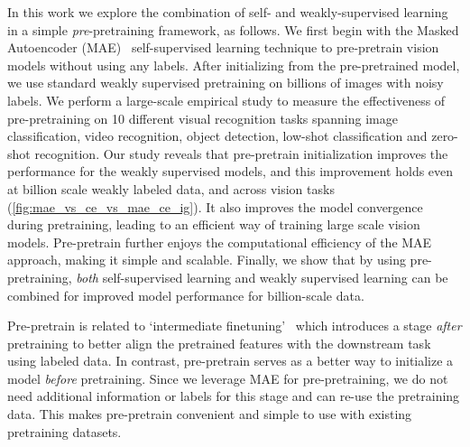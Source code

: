 \documentclass[10pt,twocolumn,letterpaper]{article}
\newcommand{\mae}{MAE\xspace}
\newcommand{\pptrain}{pre-pretrain\xspace}
\newcommand{\Pptrain}{Pre-pretrain\xspace}
\newcommand{\pptraining}{pre-pretraining\xspace}
\begin{document}
In this work we explore the combination of self- and weakly-supervised learning in a simple \textit{pre}-pretraining framework, as follows. 
We first begin with the Masked Autoencoder (\mae)~\cite{he2021masked} self-supervised learning technique to \pptrain vision models without using any labels.
After initializing from the pre-pretrained model, we use standard weakly supervised pretraining on billions of images with noisy labels.
We perform a large-scale empirical study to measure the effectiveness of pre-pretraining on 10 different visual recognition tasks spanning image classification, video recognition, object detection, low-shot classification and zero-shot recognition. 
Our study reveals that \pptrain initialization improves the performance for the weakly supervised models, and this improvement holds even at billion scale weakly labeled data, and across vision tasks (\cref{fig:mae_vs_ce_vs_mae_ce_ig}).
It also improves the model convergence during pretraining, leading to an efficient way of training large scale vision models.
\Pptrain further enjoys the computational efficiency of the MAE approach, making it simple and scalable.
Finally, we show that by using \pptraining, \emph{both} self-supervised learning and weakly supervised learning can be combined for improved model performance for billion-scale data.

\Pptrain is related to `intermediate finetuning'~\cite{bao2021beit, liu2022swin} which introduces a stage \emph{after} pretraining to better align the pretrained features with the downstream task using labeled data.
In contrast, \pptrain serves as a better way to initialize a model \emph{before} pretraining.
Since we leverage MAE for \pptraining, we do not need additional information or labels for this stage and can re-use the pretraining data.
This makes \pptrain convenient and simple to use with existing pretraining datasets.
\end{document}
